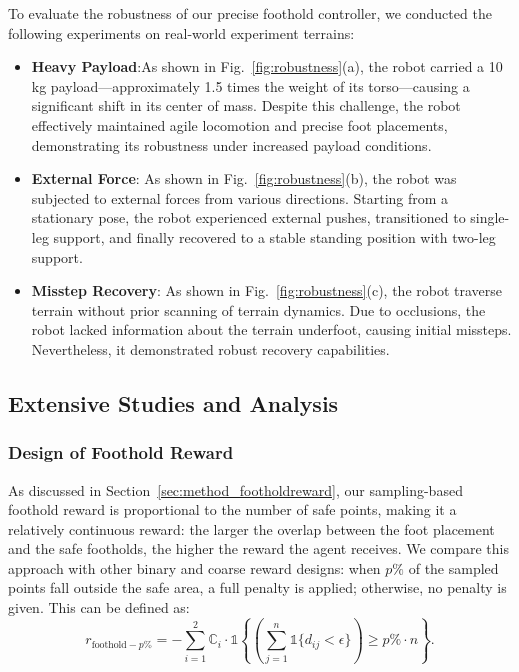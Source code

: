 To evaluate the robustness of our precise foothold controller, we conducted the following experiments on real-world experiment terrains:
\begin{itemize}
    \item \textbf{Heavy Payload}:As shown in Fig.~\ref{fig:robustness}(a), the robot carried a 10 kg payload—approximately 1.5 times the weight of its torso—causing a significant shift in its center of mass. Despite this challenge, the robot effectively maintained agile locomotion and precise foot placements, demonstrating its robustness under increased payload conditions.
    \item \textbf{External Force}: As shown in Fig.~\ref{fig:robustness}(b), the robot was subjected to external forces from various directions. Starting from a stationary pose, the robot experienced external pushes, transitioned to single-leg support, and finally recovered to a stable standing position with two-leg support.
    \item \textbf{Misstep Recovery}: As shown in Fig.~\ref{fig:robustness}(c), the robot traverse terrain without prior scanning of terrain dynamics. Due to occlusions, the robot lacked information about the terrain underfoot, causing initial missteps. Nevertheless, it demonstrated robust recovery capabilities.
\end{itemize}

\subsection{Extensive Studies and Analysis}

\subsubsection{Design of Foothold Reward}



As discussed in Section~\ref{sec:method_footholdreward}, our sampling-based foothold reward is proportional to the number of safe points, making it a relatively continuous reward: the larger the overlap between the foot placement and the safe footholds, the higher the reward the agent receives. We compare this approach with other binary and coarse reward designs: when $p\%$ of the sampled points fall outside the safe area, a full penalty is applied; otherwise, no penalty is given. This can be defined as:
\begin{equation}
    r_{\text{foothold}-p\%} = -\sum_{i=1}^2 \mathbb{C}_i \cdot \mathds{1} \left\{ \left( \sum_{j=1}^n \mathds{1} \{ d_{ij} < \epsilon \} \right) \ge p\% \cdot  n\right\}.
\end{equation}

